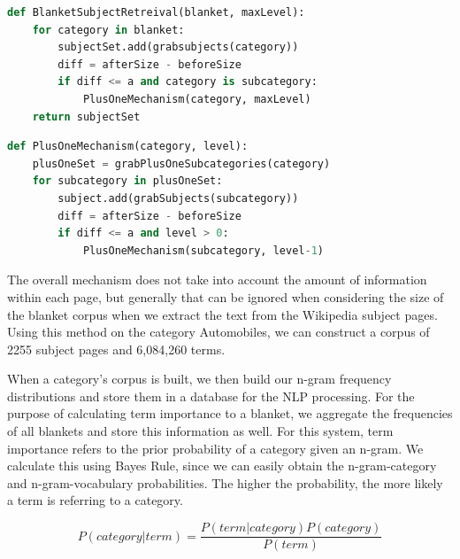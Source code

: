 \begin{lstlisting}[language=Python,frame=single,tabsize=2,caption=BlanketSubjectRetreival, label=BlanketSubjectRetreival]
def BlanketSubjectRetreival(blanket, maxLevel):
	for category in blanket:
		subjectSet.add(grabsubjects(category))
		diff = afterSize - beforeSize
		if diff <= a and category is subcategory:
			PlusOneMechanism(category, maxLevel)
	return subjectSet
\end{lstlisting}

\begin{lstlisting}[language=Python,frame=single,tabsize=2,caption=PlusOneMechanism, label=PlusOneMechanism]
def PlusOneMechanism(category, level):
	plusOneSet = grabPlusOneSubcategories(category)
	for subcategory in plusOneSet:
		subject.add(grabSubjects(subcategory))
		diff = afterSize - beforeSize
		if diff <= a and level > 0:
			PlusOneMechanism(subcategory, level-1)


\end{lstlisting}

The overall mechanism does not take into account the amount of information within each page, but generally that can be ignored when considering the size of the blanket corpus when we extract the text from the Wikipedia subject pages. Using this method on the category Automobiles, we can construct a corpus of 2255 subject pages and 6,084,260 terms.

When a category's corpus is built, we then build our n-gram frequency distributions and store them in a database for the NLP processing. For the purpose of calculating term importance to a blanket, we aggregate the frequencies of all blankets and store this information as well. For this system, term importance refers to the prior probability of a category given an n-gram. We calculate this using Bayes Rule, since we can easily obtain the n-gram-category and n-gram-vocabulary probabilities. The higher the probability, the more likely a term is referring to a category.

\begin{equation}
P (category | term) = \frac{P(term | category) P(category)}{P(term)}
\end{equation}
